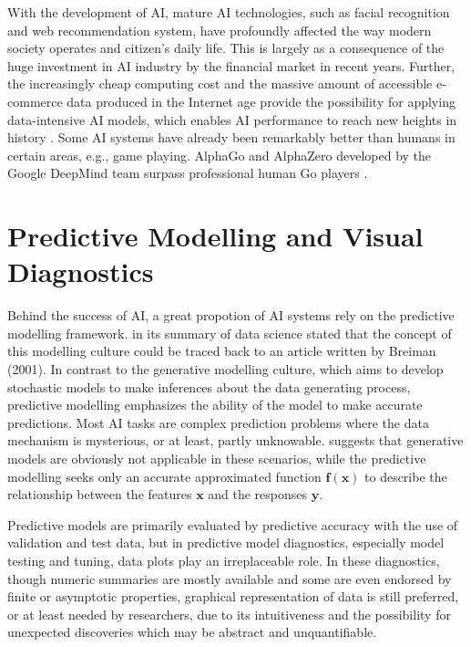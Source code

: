 \documentclass{monashthesis}
\theoremstyle{definition}
\theoremstyle{definition}
\theoremstyle{definition}
\theoremstyle{definition}
\theoremstyle{remark}
\begin{document}
With the development of AI, mature AI technologies, such as facial recognition and web recommendation system, have profoundly affected the way modern society operates and citizen's daily life. This is largely as a consequence of the huge investment in AI industry by the financial market in recent years. Further, the increasingly cheap computing cost and the massive amount of accessible e-commerce data produced in the Internet age provide the possibility for applying data-intensive AI models, which enables AI performance to reach new heights in history \autocite{jordan_machine_2015}. Some AI systems have already been remarkably better than humans in certain areas, e.g., game playing. AlphaGo and AlphaZero developed by the Google DeepMind team surpass professional human Go players \autocite{silver_general_2018}.

\hypertarget{predictive-modelling-and-visual-diagnostics}{%
\section{Predictive Modelling and Visual Diagnostics}\label{predictive-modelling-and-visual-diagnostics}}

Behind the success of AI, a great propotion of AI systems rely on the predictive modelling framework. \textcite{donoho_50_2017} in its summary of data science stated that the concept of this modelling culture could be traced back to an article written by Breiman (2001). In contrast to the generative modelling culture, which aims to develop stochastic models to make inferences about the data generating process, predictive modelling emphasizes the ability of the model to make accurate predictions. Most AI tasks are complex prediction problems where the data mechanism is mysterious, or at least, partly unknowable. \textcite{breiman_statistical_2001} suggests that generative models are obviously not applicable in these scenarios, while the predictive modelling seeks only an accurate approximated function \(\boldsymbol{f}(\boldsymbol{x})\) to describe the relationship between the features \(\boldsymbol{x}\) and the responses \(\boldsymbol{y}\).

Predictive models are primarily evaluated by predictive accuracy with the use of validation and test data, but in predictive model diagnostics, especially model testing and tuning, data plots play an irreplaceable role. In these diagnostics, though numeric summaries are mostly available and some are even endorsed by finite or asymptotic properties, graphical representation of data is still preferred, or at least needed by researchers, due to its intuitiveness and the possibility for unexpected discoveries which may be abstract and unquantifiable.
\end{document}
